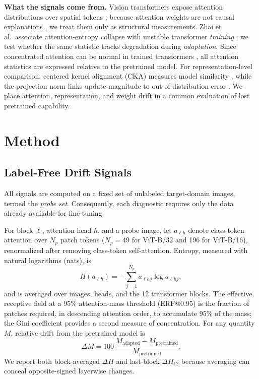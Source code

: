 \documentclass[conference]{IEEEtran}
\begin{document}
\textbf{What the signals come from.}
Vision transformers expose attention distributions over spatial tokens \cite{dosovitskiy2021image}; because attention weights are not causal explanations \cite{jain2019attention,wiegreffe2019attention}, we treat them only as structural measurements. Zhai et al.\ associate attention-entropy collapse with unstable transformer \emph{training} \cite{zhai2023stabilizing}; we test whether the same statistic tracks degradation during \emph{adaptation}. Since concentrated attention can be normal in trained transformers \cite{xiao2024efficient,darcet2024vision}, all attention statistics are expressed relative to the pretrained model. For representation-level comparison, centered kernel alignment (CKA) measures model similarity \cite{kornblith2019similarity}, while the projection norm links update magnitude to out-of-distribution error \cite{yu2022predicting}. We place attention, representation, and weight drift in a common evaluation of lost pretrained capability.

\section{Method}
\subsection{Label-Free Drift Signals}
All signals are computed on a fixed set of unlabeled target-domain images, termed the \emph{probe set}. Consequently, each diagnostic requires only the data already available for fine-tuning.

For block $\ell$, attention head $h$, and a probe image, let $a_{\ell h}$ denote class-token attention over $N_p$ patch tokens ($N_p=49$ for ViT-B/32 and 196 for ViT-B/16), renormalized after removing class-token self-attention. Entropy, measured with natural logarithms (nats), is
\begin{equation}
H(a_{\ell h})=-\sum_{j=1}^{N_p}a_{\ell hj}\log a_{\ell hj},
\end{equation}
and is averaged over images, heads, and the 12 transformer blocks. The effective receptive field at a 95\% attention-mass threshold (ERF@0.95) is the fraction of patches required, in descending attention order, to accumulate 95\% of the mass; the Gini coefficient provides a second measure of concentration. For any quantity $M$, relative drift from the pretrained model is
\begin{equation}
\Delta M = 100\,\frac{M_{\mathrm{adapted}}-M_{\mathrm{pretrained}}}{M_{\mathrm{pretrained}}}.
\end{equation}
We report both block-averaged $\Delta H$ and last-block $\Delta H_{12}$ because averaging can conceal opposite-signed layerwise changes.
\end{document}
